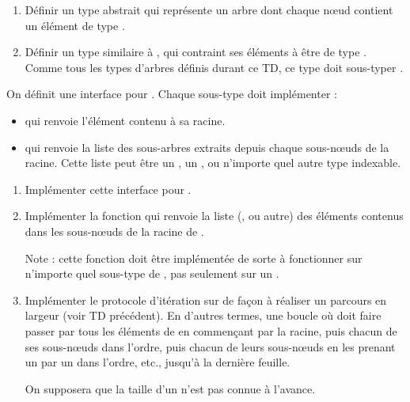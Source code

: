 \documentclass{article}
\begin{document}
\begin{enumerate}
	\item Définir un type abstrait  qui représente un arbre dont chaque nœud contient un élément de type .
	
	\item Définir un type  similaire à , qui contraint ses éléments à être de type . Comme tous les types d'arbres définis durant ce TD, ce type doit sous-typer .
\end{enumerate}

\noindent On définit une interface pour . Chaque sous-type doit implémenter :
\begin{itemize}
	\item {} qui renvoie l'élément contenu à sa racine.
	\item {} qui renvoie la liste des sous-arbres extraits depuis chaque sous-nœuds de la racine. Cette liste peut être un , un , ou n'importe quel autre type indexable.
\end{itemize}

\begin{enumerate}[resume]
	\item Implémenter cette interface pour .
	
	\item Implémenter la fonction  qui renvoie la liste (,  ou autre) des éléments contenus dans les sous-nœuds de la racine de .
	
	Note : cette fonction doit être implémentée de sorte à fonctionner sur n'importe quel sous-type de , pas seulement sur un .
	
	\item Implémenter le protocole d'itération sur  de façon à réaliser un parcours en largeur (voir TD précédent). En d'autres termes, une boucle  où  doit faire passer  par tous les éléments de  en commençant par la racine, puis chacun de ses sous-nœuds dans l'ordre, puis chacun de leurs sous-nœuds en les prenant un par un dans l'ordre, etc., jusqu'à la dernière feuille.
	
	On supposera que la taille d'un  n'est pas connue à l'avance.
\end{enumerate}
\end{document}

